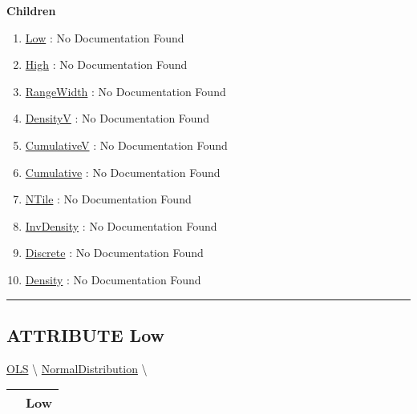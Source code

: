 \textbf{Children}
\begin{enumerate}
\item \hyperlink{ecldoc:linearregression.ols.distributionbase.low}{Low}
: No Documentation Found
\item \hyperlink{ecldoc:linearregression.ols.distributionbase.high}{High}
: No Documentation Found
\item \hyperlink{ecldoc:linearregression.ols.distributionbase.rangewidth}{RangeWidth}
: No Documentation Found
\item \hyperlink{ecldoc:linearregression.ols.distributionbase.densityv}{DensityV}
: No Documentation Found
\item \hyperlink{ecldoc:linearregression.ols.distributionbase.cumulativev}{CumulativeV}
: No Documentation Found
\item \hyperlink{ecldoc:linearregression.ols.distributionbase.cumulative}{Cumulative}
: No Documentation Found
\item \hyperlink{ecldoc:linearregression.ols.distributionbase.ntile}{NTile}
: No Documentation Found
\item \hyperlink{ecldoc:linearregression.ols.distributionbase.invdensity}{InvDensity}
: No Documentation Found
\item \hyperlink{ecldoc:linearregression.ols.distributionbase.discrete}{Discrete}
: No Documentation Found
\item \hyperlink{ecldoc:linearregression.ols.normaldistribution.density}{Density}
: No Documentation Found
\end{enumerate}

\rule{\linewidth}{0.5pt}

\subsection*{\textsf{\colorbox{headtoc}{\color{white} ATTRIBUTE}
Low}}

\hypertarget{ecldoc:linearregression.ols.distributionbase.low}{}
\hspace{0pt} \hyperlink{ecldoc:linearregression.ols}{OLS} \textbackslash 
\hspace{0pt} \hyperlink{ecldoc:linearregression.ols.normaldistribution}{NormalDistribution} \textbackslash 

{\renewcommand{\arraystretch}{1.5}
\begin{tabularx}{\textwidth}{|>{\raggedright\arraybackslash}l|X|}
\hline
\hspace{0pt}\mytexttt{\color{red} } & \textbf{Low} \\
\hline
\end{tabularx}
}

